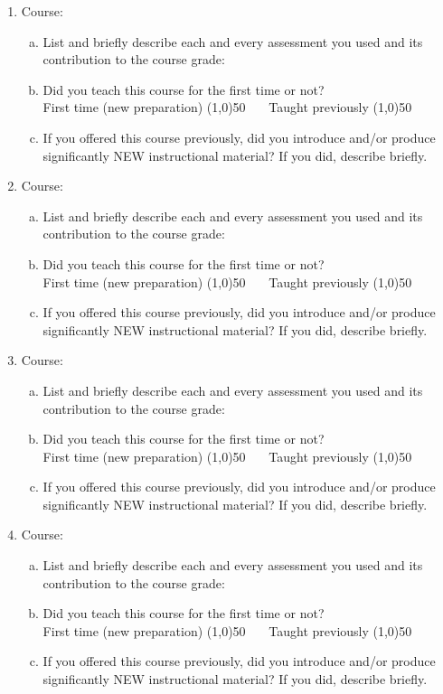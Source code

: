 \begin{enumerate}
  \item Course: 
    \begin{enumerate}[a)]
    \item  List and briefly describe each and every assessment you used and its contribution to the course grade:
    \item Did you teach this course for the first time or not? \\
      First time (new preparation) \line(1,0){50}  ~~~Taught previously \line(1,0){50}
    \item If you offered this course previously, did you introduce and/or produce significantly NEW instructional material? If you did, describe briefly. 
    \end{enumerate}
  \item Course: 
    \begin{enumerate}[a)]
    \item  List and briefly describe each and every assessment you used and its contribution to the course grade:
    \item Did you teach this course for the first time or not? \\
      First time (new preparation) \line(1,0){50}  ~~~Taught previously \line(1,0){50}
    \item If you offered this course previously, did you introduce and/or produce significantly NEW instructional material? If you did, describe briefly. 
    \end{enumerate}
  \item Course: 
    \begin{enumerate}[a)]
    \item  List and briefly describe each and every assessment you used and its contribution to the course grade:
    \item Did you teach this course for the first time or not? \\
      First time (new preparation) \line(1,0){50}  ~~~Taught previously \line(1,0){50}
    \item If you offered this course previously, did you introduce and/or produce significantly NEW instructional material? If you did, describe briefly. 
    \end{enumerate}
  \item Course: 
    \begin{enumerate}[a)]
    \item  List and briefly describe each and every assessment you used and its contribution to the course grade:
    \item Did you teach this course for the first time or not? \\
      First time (new preparation) \line(1,0){50}  ~~~Taught previously \line(1,0){50}
    \item If you offered this course previously, did you introduce and/or produce significantly NEW instructional material? If you did, describe briefly. 
    \end{enumerate}
\end{enumerate}
